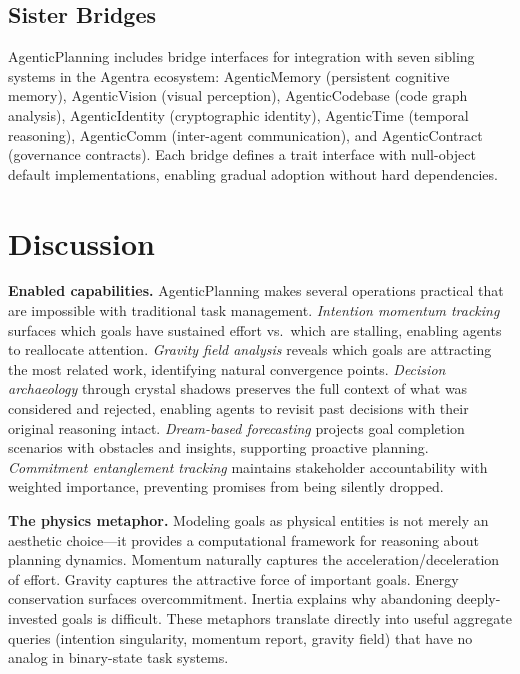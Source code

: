 \documentclass[10pt, twocolumn]{article}
\begin{document}
\subsection{Sister Bridges}
\label{sec:bridges}

AgenticPlanning includes bridge interfaces for integration with seven sibling systems in the Agentra ecosystem: AgenticMemory (persistent cognitive memory), AgenticVision (visual perception), AgenticCodebase (code graph analysis), AgenticIdentity (cryptographic identity), AgenticTime (temporal reasoning), AgenticComm (inter-agent communication), and AgenticContract (governance contracts). Each bridge defines a trait interface with null-object default implementations, enabling gradual adoption without hard dependencies.


\section{Discussion}
\label{sec:discussion}

\textbf{Enabled capabilities.} AgenticPlanning makes several operations practical that are impossible with traditional task management. \emph{Intention momentum tracking} surfaces which goals have sustained effort vs.\ which are stalling, enabling agents to reallocate attention. \emph{Gravity field analysis} reveals which goals are attracting the most related work, identifying natural convergence points. \emph{Decision archaeology} through crystal shadows preserves the full context of what was considered and rejected, enabling agents to revisit past decisions with their original reasoning intact. \emph{Dream-based forecasting} projects goal completion scenarios with obstacles and insights, supporting proactive planning. \emph{Commitment entanglement tracking} maintains stakeholder accountability with weighted importance, preventing promises from being silently dropped.

\textbf{The physics metaphor.} Modeling goals as physical entities is not merely an aesthetic choice---it provides a computational framework for reasoning about planning dynamics. Momentum naturally captures the acceleration/deceleration of effort. Gravity captures the attractive force of important goals. Energy conservation surfaces overcommitment. Inertia explains why abandoning deeply-invested goals is difficult. These metaphors translate directly into useful aggregate queries (intention singularity, momentum report, gravity field) that have no analog in binary-state task systems.
\end{document}
